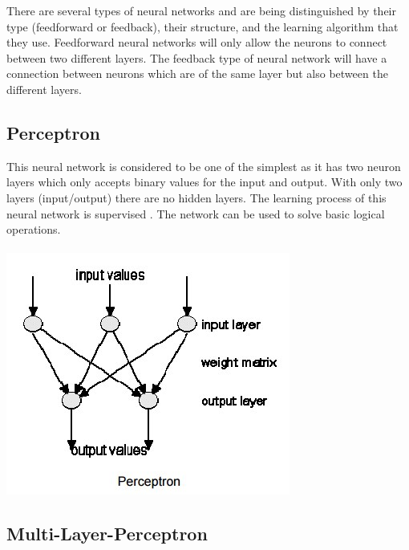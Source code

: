 There are several types of neural networks and are being distinguished by their type (feedforward or feedback), their structure, and the learning algorithm that they use.
Feedforward neural networks will only allow the neurons to connect between two different layers. The feedback type of neural network will have a connection between neurons which are of the same layer but also between the different layers.

\subsection{Perceptron}

This neural network is considered to be one of the simplest as it has two neuron layers which only accepts binary values for the input and output. With only two layers (input/output) there are no hidden layers.
The learning process of this neural network is supervised . The network can be used to solve basic logical operations. 
\\
\\
\includegraphics[scale=0.5]{images/perceptron.jpg}

\subsection{Multi-Layer-Perceptron}






 



